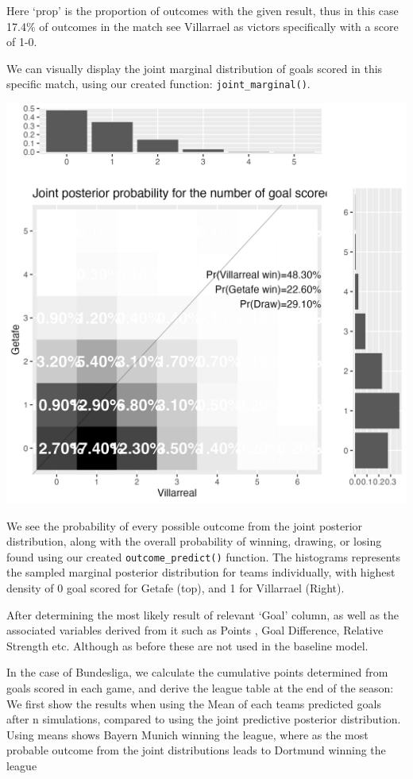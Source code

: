 \documentclass[
]{article}
\begin{document}
Here `prop' is the proportion of outcomes with the given result, thus in
this case 17.4\% of outcomes in the match see Villarrael as victors
specifically with a score of 1-0.

We can visually display the joint marginal distribution of goals scored
in this specific match, using our created function:
\texttt{joint\_marginal()}.

\includegraphics[width=25in]{VillaraelGetafeJM}

We see the probability of every possible outcome from the joint
posterior distribution, along with the overall probability of winning,
drawing, or losing found using our created \texttt{outcome\_predict()}
function. The histograms represents the sampled marginal posterior
distribution for teams individually, with highest density of 0 goal
scored for Getafe (top), and 1 for Villarrael (Right).

After determining the most likely result of relevant `Goal' column, as
well as the associated variables derived from it such as Points , Goal
Difference, Relative Strength etc. Although as before these are not used
in the baseline model.

In the case of Bundesliga, we calculate the cumulative points determined
from goals scored in each game, and derive the league table at the end
of the season: We first show the results when using the Mean of each
teams predicted goals after n simulations, compared to using the joint
predictive posterior distribution. Using means shows Bayern Munich
winning the league, where as the most probable outcome from the joint
distributions leads to Dortmund winning the league
\end{document}
